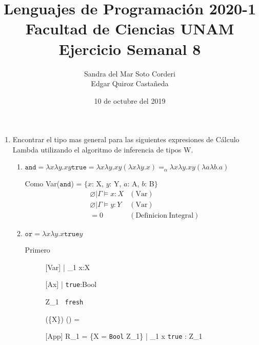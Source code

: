 \documentclass{article}
\title{
    Lenguajes de Programación 2020-1\\
    Facultad de Ciencias UNAM\\
    Ejercicio Semanal 8
}
\author{
    Sandra del Mar Soto Corderi\\
    Edgar Quiroz Castañeda
}
\date{
    10 de octubre del 2019
}
\begin{document}
    \maketitle

    \begin{enumerate}
        \item {
		   Encontrar el tipo mas general para las siguientes expresiones de 
		   Cálculo Lambda utilizando el algoritmo de inferencia de tipos W.
        	
        	\begin{enumerate}
        		\item {
				 $\texttt{and} = \lambda x\lambda y.xy\texttt{true} = 
				 \lambda x\lambda y.xy (\lambda x\lambda y.x) 
				 =_{\alpha} \lambda x\lambda y.xy (\lambda a\lambda b.a)$
        		 
        		 Como Var($\texttt{and}$) = $\{x$: X, $y$: Y, $a$: A, $b$: B$\}$
        		 \begin{align}        		 
        		 &\varnothing | \Gamma \models x : X &\mathrm{(Var)}\\
        		 &\varnothing | \Gamma \models y : Y &\mathrm{(Var)}\\
        		 &= 0 &\mathrm{(Definicion \ Integral)}
        		 \end{align}
        		}
        		\item {
					$\texttt{or} = \lambda x \lambda y.x \texttt{true} y$
					 
					Primero
					\begin{figure}[H]
						\centering
						\begin{prooftree}

							 [Var] {
								\varnothing | \Gamma_1 \vdash x:X
							}

							 [Ax] {
								\varnothing | \varnothing
								\vdash \texttt{true}:Bool
							}


							 {Z_1 \texttt{ fresh}}

							 {
								(\varnothing \cup \{X\})
								\cap
								(\varnothing \cup \varnothing)
								= \varnothing
							}

							 [App] {
								R_1 = \{X = \texttt{Bool} \mapsto Z_1\} 
								| \Gamma_1
								\vdash x \texttt{true} : Z_1
							}
						\end{prooftree}
						\label{A}
					\end{figure}

}
\end{enumerate}}
\end{enumerate}
\end{document}
